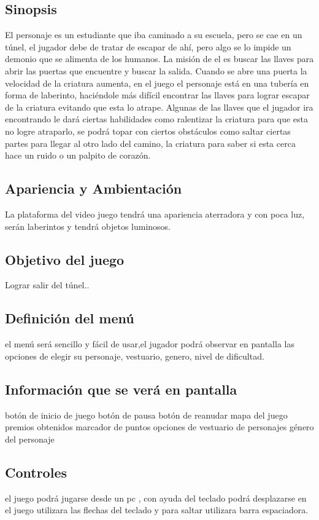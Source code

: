 \documentclass{article}
\begin{document}
\subsection{Sinopsis}
%
El personaje es un estudiante que iba caminado a su escuela, pero se cae en un túnel, el jugador debe de tratar de escapar de ahí, pero algo se lo impide un demonio que se alimenta de los humanos. La misión de el es buscar las llaves para abrir las puertas que encuentre y buscar la salida.
Cuando se abre una puerta la velocidad de la criatura aumenta, en el juego el personaje está en una tubería en forma de laberinto, haciéndole más difícil encontrar las llaves para lograr escapar de la criatura evitando que esta lo atrape.
Algunas de las llaves que el jugador ira encontrando le dará ciertas habilidades como ralentizar la criatura para que esta no logre atraparlo, se podrá topar con ciertos obstáculos como saltar ciertas partes para llegar al otro lado del camino, la criatura para saber si esta cerca hace un ruido o un palpito de corazón.

\subsection{Apariencia y Ambientación}
%
La plataforma del video juego tendrá una apariencia aterradora y con poca luz, serán laberintos y tendrá objetos luminosos.

\subsection{Objetivo del juego}
%
Lograr salir del túnel..


\subsection{Definición del menú}
%
el menú será sencillo y fácil de usar,el jugador podrá observar en pantalla las opciones de elegir su personaje, vestuario, genero, nivel de dificultad.

\subsection{Información que se verá en pantalla}
%
botón de inicio de juego
botón de pausa
botón de reanudar
mapa del juego 
premios obtenidos
marcador de puntos
opciones de vestuario de personajes
género del personaje

\subsection{Controles}
%
el juego podrá jugarse desde un pc , con ayuda del teclado podrá desplazarse en el juego utilizara las flechas del teclado y para saltar utilizara barra espaciadora.
\end{document}
